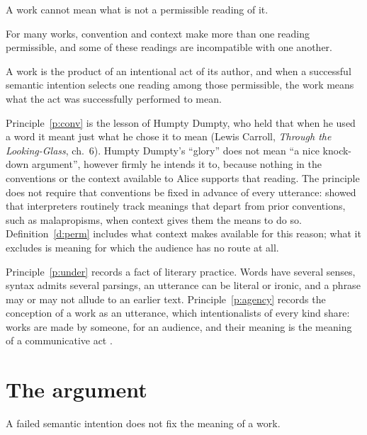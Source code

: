 \documentclass{situationist-preprint}
\begin{document}
\begin{principle}\label{p:conv}
A work cannot mean what is not a permissible reading of it.
\end{principle}

\begin{principle}[Underdetermination]\label{p:under}
For many works, convention and context make more than one reading permissible, and some of these readings are incompatible with one another.
\end{principle}

\begin{principle}[Agency]\label{p:agency}
A work is the product of an intentional act of its author, and when a successful semantic intention selects one reading among those permissible, the work means what the act was successfully performed to mean.
\end{principle}

Principle~\ref{p:conv} is the lesson of Humpty Dumpty, who held that when he used a word it meant just what he chose it to mean (Lewis Carroll, \emph{Through the Looking-Glass}, ch.~6). Humpty Dumpty's \enquote{glory} does not mean \enquote{a nice knock-down argument}, however firmly he intends it to, because nothing in the conventions or the context available to Alice supports that reading. The principle does not require that conventions be fixed in advance of every utterance: \citet{Davidson1986} showed that interpreters routinely track meanings that depart from prior conventions, such as malapropisms, when context gives them the means to do so. Definition~\ref{d:perm} includes what context makes available for this reason; what it excludes is meaning for which the audience has no route at all.

Principle~\ref{p:under} records a fact of literary practice. Words have several senses, syntax admits several parsings, an utterance can be literal or ironic, and a phrase may or may not allude to an earlier text. Principle~\ref{p:agency} records the conception of a work as an utterance, which intentionalists of every kind share: works are made by someone, for an audience, and their meaning is the meaning of a communicative act \citep{Carroll1992,Stecker2003}.

\section{The argument}

\begin{lemma}\label{l:failed}
A failed semantic intention does not fix the meaning of a work.
\end{lemma}
\end{document}
